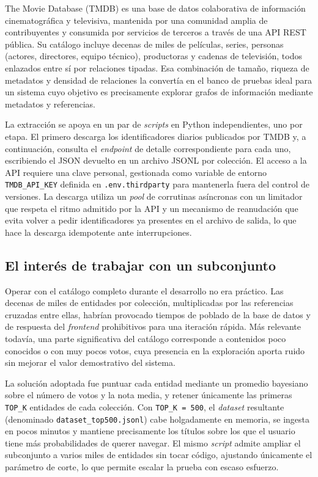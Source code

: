The Movie Database (TMDB) es una base de datos colaborativa de
información cinematográfica y televisiva, mantenida por una comunidad
amplia de contribuyentes y consumida por servicios de terceros a través
de una API REST pública. Su catálogo incluye decenas de miles de
películas, series, personas (actores, directores, equipo técnico),
productoras y cadenas de televisión, todos enlazados entre sí por
relaciones tipadas. Esa combinación de tamaño, riqueza de metadatos y
densidad de relaciones la convertía en el banco de pruebas ideal para
un sistema cuyo objetivo es precisamente explorar grafos de información
mediante metadatos y referencias.

La extracción se apoya en un par de \textit{scripts} en Python independientes,
uno por etapa. El primero descarga los identificadores diarios
publicados por TMDB y, a continuación, consulta el \textit{endpoint} de detalle
correspondiente para cada uno, escribiendo el JSON devuelto en un
archivo JSONL por colección. El acceso a la API requiere una clave
personal, gestionada como variable de entorno \texttt{TMDB\_API\_KEY}
definida en \texttt{.env.thirdparty} para mantenerla fuera del control
de versiones. La descarga utiliza un \textit{pool} de corrutinas asíncronas con
un limitador que respeta el ritmo admitido por la API y un mecanismo
de reanudación que evita volver a pedir identificadores ya presentes
en el archivo de salida, lo que hace la descarga idempotente ante
interrupciones.

\subsection*{El interés de trabajar con un subconjunto}

Operar con el catálogo completo durante el desarrollo no era práctico.
Las decenas de miles de entidades por colección, multiplicadas por las
referencias cruzadas entre ellas, habrían provocado tiempos de poblado
de la base de datos y de respuesta del \textit{frontend} prohibitivos para una
iteración rápida. Más relevante todavía, una parte significativa del
catálogo corresponde a contenidos poco conocidos o con muy pocos votos,
cuya presencia en la exploración aporta ruido sin mejorar el valor
demostrativo del sistema.

La solución adoptada fue puntuar cada entidad mediante un promedio
bayesiano sobre el número de votos y la nota media, y retener
únicamente las primeras \texttt{TOP\_K} entidades de cada colección.
Con \texttt{TOP\_K = 500}, el \textit{dataset} resultante (denominado
\texttt{dataset\_top500.jsonl}) cabe holgadamente en memoria, se ingesta
en pocos minutos y mantiene precisamente los títulos sobre los que el
usuario tiene más probabilidades de querer navegar. El mismo \textit{script}
admite ampliar el subconjunto a varios miles de entidades sin tocar
código, ajustando únicamente el parámetro de corte, lo que permite
escalar la prueba con escaso esfuerzo.

